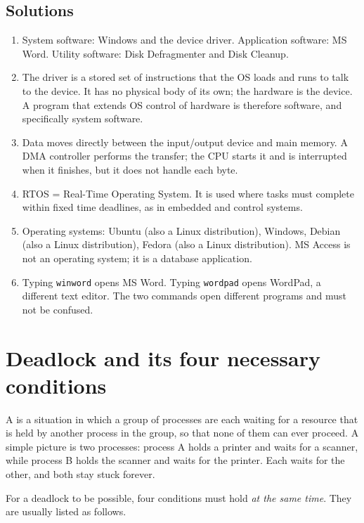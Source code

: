 \subsection*{Solutions}
\begingroup\small
\begin{enumerate}[label=\arabic*.]
  \item System software: Windows and the device driver. Application
    software: MS Word. Utility software: Disk Defragmenter and Disk Cleanup.
  \item The driver is a stored set of instructions that the OS loads and
    runs to talk to the device. It has no physical body of its own; the
    hardware is the device. A program that extends OS control of hardware is
    therefore software, and specifically system software.
  \item Data moves directly between the input/output device and main memory.
    A DMA controller performs the transfer; the CPU starts it and is
    interrupted when it finishes, but it does not handle each byte.
  \item RTOS = Real-Time Operating System. It is used where tasks must
    complete within fixed time deadlines, as in embedded and control
    systems.
  \item Operating systems: Ubuntu (also a Linux distribution), Windows,
    Debian (also a Linux distribution), Fedora (also a Linux distribution).
    MS Access is not an operating system; it is a database application.
  \item Typing \texttt{winword} opens MS Word. Typing \texttt{wordpad} opens
    WordPad, a different text editor. The two commands open different
    programs and must not be confused.
\end{enumerate}
\endgroup

\section{Deadlock and its four necessary conditions}
A  is a situation in which a group of processes are each waiting
for a resource that is held by another process in the group, so that none of
them can ever proceed. A simple picture is two processes: process A holds a
printer and waits for a scanner, while process B holds the scanner and waits
for the printer. Each waits for the other, and both stay stuck forever.

For a deadlock to be possible, four conditions must hold \emph{at the same
time}. They are usually listed as follows.

